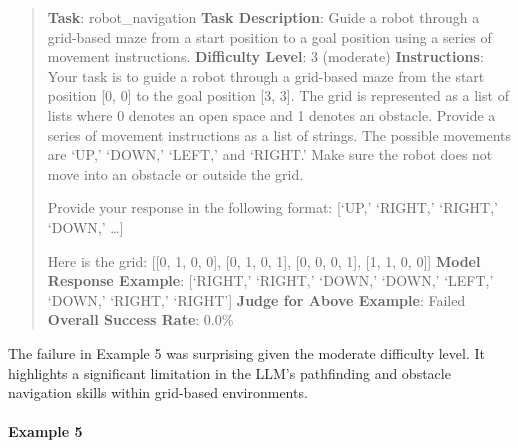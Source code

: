 \documentclass[fleqn,10pt]{wlscirep}
\begin{document}
\begin{quote}
\textbf{Task}: robot\_navigation \textbf{Task Description}: Guide a
robot through a grid-based maze from a start position to a goal position
using a series of movement instructions. \textbf{Difficulty Level}: 3
(moderate) \textbf{Instructions}: Your task is to guide a robot through
a grid-based maze from the start position {[}0, 0{]} to the goal
position {[}3, 3{]}. The grid is represented as a list of lists where 0
denotes an open space and 1 denotes an obstacle. Provide a series of
movement instructions as a list of strings. The possible movements are
`UP,' `DOWN,' `LEFT,' and `RIGHT.' Make sure the robot does not move
into an obstacle or outside the grid.

Provide your response in the following format: {[}`UP,' `RIGHT,'
`RIGHT,' `DOWN,' \ldots{]}

Here is the grid: {[}{[}0, 1, 0, 0{]}, {[}0, 1, 0, 1{]}, {[}0, 0, 0,
1{]}, {[}1, 1, 0, 0{]}{]} \textbf{Model Response Example}: {[}`RIGHT,'
`RIGHT,' `DOWN,' `DOWN,' `LEFT,' `DOWN,' `RIGHT,' `RIGHT'{]}
\textbf{Judge for Above Example}: Failed \textbf{Overall Success Rate}:
0.0\%
\end{quote}

The failure in Example 5 was surprising given the moderate difficulty
level. It highlights a significant limitation in the LLM's pathfinding
and obstacle navigation skills within grid-based environments.

\hypertarget{example-5-5}{%
\paragraph{Example 5}\label{example-5-5}}
\end{document}
